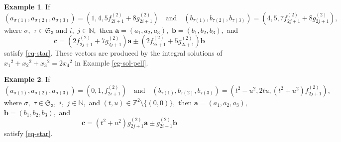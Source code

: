\documentclass{article}
\theoremstyle{definition}
\newtheorem{eg}{Example}
\theoremstyle{plain}
\begin{document}
\begin{eg}
If 
\[ (a_{\sigma (1)},a_{\sigma (2)},a_{\sigma (3)}) = (1,4,5f_{2i+1}^{(2)}+8g_{2i+1}^{(2)}) \quad\text{and}\quad (b_{\tau (1)},b_{\tau (2)},b_{\tau (3)}) = (4,5,7f_{2j+1}^{(2)}+8g_{2j+1}^{(2)}),\] 
where $\sigma,$ $\tau \in \mathfrak S_3$ and $i,$ $j \in \mathbb N,$ then $\bm{a} = (a_1,a_2,a_3),$ $\bm{b} = (b_1,b_2,b_3),$ and 
\[\bm{c} = (2f_{2j+1}^{(2)}+7g_{2j+1}^{(2)})\bm{a}\pm (2f_{2i+1}^{(2)}+5g_{2i+1}^{(2)})\bm{b}\] 
satisfy \eqref{eq-star}. 
These vectors are produced by the integral solutions of $x_1{}^2+x_2{}^2+x_3{}^2 = 2x_4{}^2$ in Example \ref{eg-sol-pell}.
\end{eg}
\begin{eg}
If 
\[ (a_{\sigma (1)},a_{\sigma (2)},a_{\sigma (3)}) = (0,1,f_{2i+1}^{(2)}) \quad\text{and}\quad (b_{\tau (1)},b_{\tau (2)},b_{\tau (3)}) = (t^2-u^2,2tu,(t^2+u^2)f_{2j+1}^{(2)}),\] 
where $\sigma,$ $\tau \in \mathfrak S_3,$ $i,$ $j \in \mathbb N,$ and $(t,u) \in \mathbb Z^2\setminus\{ (0,0)\},$ then $\bm{a} = (a_1,a_2,a_3),$ $\bm{b} = (b_1,b_2,b_3),$ and 
\[\bm{c} = (t^2+u^2)g_{2j+1}^{(2)}\bm{a}\pm g_{2i+1}^{(2)}\bm{b}\] 
satisfy \eqref{eq-star}.
\end{eg}
\end{document}
